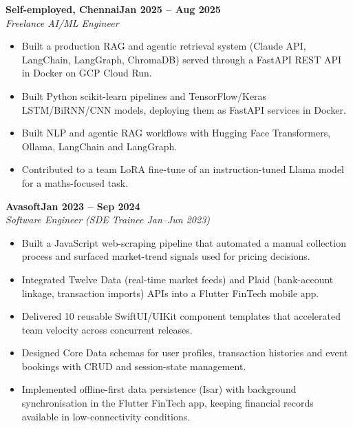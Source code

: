 \documentclass[a4paper,11pt]{article}
\newcommand{\entry}[4]{\needspace{4\baselineskip}\noindent\textbf{#1}\hfill\textbf{#2}\\ \textit{#3}\hfill\textit{#4}\par}
\begin{document}
\vspace{4pt}
\entry{Self-employed, Chennai}{Jan 2025 – Aug 2025}{Freelance AI/ML Engineer}{}
\begin{itemize}
  \item Built a production RAG and agentic retrieval system (Claude API, LangChain, LangGraph, ChromaDB) served through a FastAPI REST API in Docker on GCP Cloud Run.
  \item Built Python scikit-learn pipelines and TensorFlow/Keras LSTM/BiRNN/CNN models, deploying them as FastAPI services in Docker.
  \item Built NLP and agentic RAG workflows with Hugging Face Transformers, Ollama, LangChain and LangGraph.
  \item Contributed to a team LoRA fine-tune of an instruction-tuned Llama model for a maths-focused task.
\end{itemize}
\vspace{4pt}
\entry{Avasoft}{Jan 2023 – Sep 2024}{Software Engineer (SDE Trainee Jan–Jun 2023)}{}
\begin{itemize}
  \item Built a JavaScript web-scraping pipeline that automated a manual collection process and surfaced market-trend signals used for pricing decisions.
  \item Integrated Twelve Data (real-time market feeds) and Plaid (bank-account linkage, transaction imports) APIs into a Flutter FinTech mobile app.
  \item Delivered 10 reusable SwiftUI/UIKit component templates that accelerated team velocity across concurrent releases.
  \item Designed Core Data schemas for user profiles, transaction histories and event bookings with CRUD and session-state management.
  \item Implemented offline-first data persistence (Isar) with background synchronisation in the Flutter FinTech app, keeping financial records available in low-connectivity conditions.
\end{itemize}

\end{document}
